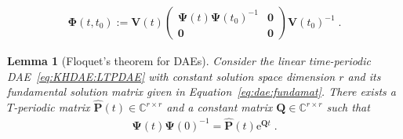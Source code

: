 \documentclass[10pt,a4paper]{amsart}
\newtheorem{lemma}{Lemma}
\newcommand{\Cspace}{\mathbb{C}}
\newcommand{\ex}{\re} %
\newcommand{\re}{\mathrm e}
\newcommand{\vP}{\mathbf P}
\newcommand{\vPh}{\mathbf \Phi}
\newcommand{\vPs}{\mathbf \Psi}
\newcommand{\vQ}{\mathbf Q}
\newcommand{\vV}{\mathbf V}
\newcommand{\vzero}{\mathbf{0}}
\begin{document}
\begin{align}\label{eq:dae:fundamat}
    \vPh(t, t_0) := \vV(t) \begin{pmatrix}
        \vPs(t) \vPs(t_0)^{-1} & \vzero \\ \vzero & \vzero
    \end{pmatrix} \vV(t_0)^{-1} \;.
\end{align}

\begin{lemma}[Floquet's theorem for DAEs]\label{eq:Floquetproof:Floquettheorem}
    Consider the linear time-periodic DAE~\eqref{eq:KHDAE:LTPDAE} with constant solution space dimension $r$ and its fundamental solution matrix given in Equation~\eqref{eq:dae:fundamat}. There exists a $T$-periodic matrix $\hat{\vP}(t) \in \Cspace^{r \times r}$ and a constant matrix $\vQ \in \Cspace^{r \times r}$ such that
    \begin{align}
        \vPs(t) \vPs(0)^{-1} = \hat{\vP}(t) \ex^{\vQ t} \;.
    \end{align}
\end{lemma}
\end{document}
